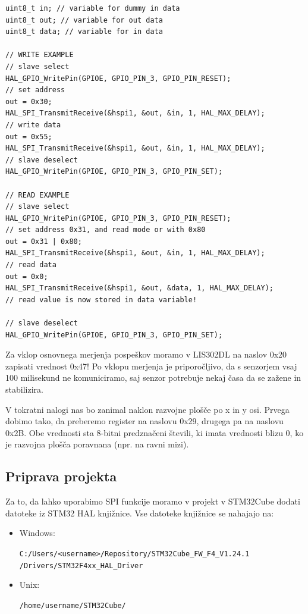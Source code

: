 \documentclass[12pt,letterpaper]{article}
\begin{document}
\begin{center}
\begin{lstlisting}[style=CStyle]
uint8_t in; // variable for dummy in data
uint8_t out; // variable for out data
uint8_t data; // variable for in data

// WRITE EXAMPLE
// slave select
HAL_GPIO_WritePin(GPIOE, GPIO_PIN_3, GPIO_PIN_RESET);
// set address
out = 0x30;
HAL_SPI_TransmitReceive(&hspi1, &out, &in, 1, HAL_MAX_DELAY);
// write data
out = 0x55;
HAL_SPI_TransmitReceive(&hspi1, &out, &in, 1, HAL_MAX_DELAY);
// slave deselect
HAL_GPIO_WritePin(GPIOE, GPIO_PIN_3, GPIO_PIN_SET);

// READ EXAMPLE
// slave select
HAL_GPIO_WritePin(GPIOE, GPIO_PIN_3, GPIO_PIN_RESET);
// set address 0x31, and read mode or with 0x80
out = 0x31 | 0x80;
HAL_SPI_TransmitReceive(&hspi1, &out, &in, 1, HAL_MAX_DELAY);
// read data
out = 0x0;
HAL_SPI_TransmitReceive(&hspi1, &out, &data, 1, HAL_MAX_DELAY);
// read value is now stored in data variable!

// slave deselect
HAL_GPIO_WritePin(GPIOE, GPIO_PIN_3, GPIO_PIN_SET);
\end{lstlisting}
\end{center}

Za vklop osnovnega merjenja pospeškov moramo v LIS302DL na naslov 0x20 zapisati vrednost 0x47! Po vklopu merjenja je priporočljivo, da s senzorjem vsaj 100 milisekund ne komuniciramo, saj senzor potrebuje nekaj časa da se zažene in stabilizira.

V tokratni nalogi nas bo zanimal naklon razvojne plošče po x in y osi. Prvega dobimo tako, da preberemo register na naslovu 0x29, drugega pa na naslovu 0x2B. Obe vrednosti sta 8-bitni predznačeni števili, ki imata vrednosti blizu 0, ko je razvojna plošča poravnana (npr. na ravni mizi).

\newpage

\subsection*{Priprava projekta}

Za to, da lahko uporabimo SPI funkcije moramo v projekt v STM32Cube dodati datoteke iz STM32 HAL knjižnice. Vse datoteke knjižnice se nahajajo na:

\begin{itemize}
    \item Windows:
    
    \texttt{C:/Users/<username>/Repository/STM32Cube\_FW\_F4\_V1.24.1\\/Drivers/STM32F4xx\_HAL\_Driver}
    
    \item Unix:
    
    \texttt{/home/username/STM32Cube/}
\end{itemize}
\end{document}
